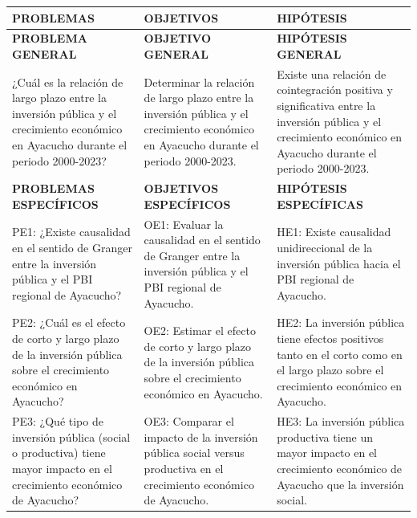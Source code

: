 \documentclass[
  man,
  floatsintext,
  longtable,
  a4paper,
  nolmodern,
  notxfonts,
  notimes,
  12pt,
  colorlinks=true,linkcolor=blue,citecolor=blue,urlcolor=blue]{apa7}
\newcounter{none} %
\begin{document}
{\def\LTcaptype{none} %
\begin{longtable}[]{@{}
  >{\raggedright\arraybackslash}p{}
  >{\raggedright\arraybackslash}p{}
  >{\raggedright\arraybackslash}p{}@{}}
\toprule\noalign{}
\begin{minipage}[b]{\linewidth}\raggedright
PROBLEMAS
\end{minipage} & \begin{minipage}[b]{\linewidth}\raggedright
OBJETIVOS
\end{minipage} & \begin{minipage}[b]{\linewidth}\raggedright
HIPÓTESIS
\end{minipage} \\
\midrule\noalign{}
\endhead
\bottomrule\noalign{}
\endlastfoot
\textbf{PROBLEMA GENERAL} & \textbf{OBJETIVO GENERAL} &
\textbf{HIPÓTESIS GENERAL} \\
¿Cuál es la relación de largo plazo entre la inversión pública y el
crecimiento económico en Ayacucho durante el periodo 2000-2023? &
Determinar la relación de largo plazo entre la inversión pública y el
crecimiento económico en Ayacucho durante el periodo 2000-2023. & Existe
una relación de cointegración positiva y significativa entre la
inversión pública y el crecimiento económico en Ayacucho durante el
periodo 2000-2023. \\
\textbf{PROBLEMAS ESPECÍFICOS} & \textbf{OBJETIVOS ESPECÍFICOS} &
\textbf{HIPÓTESIS ESPECÍFICAS} \\
PE1: ¿Existe causalidad en el sentido de Granger entre la inversión
pública y el PBI regional de Ayacucho? & OE1: Evaluar la causalidad en
el sentido de Granger entre la inversión pública y el PBI regional de
Ayacucho. & HE1: Existe causalidad unidireccional de la inversión
pública hacia el PBI regional de Ayacucho. \\
PE2: ¿Cuál es el efecto de corto y largo plazo de la inversión pública
sobre el crecimiento económico en Ayacucho? & OE2: Estimar el efecto de
corto y largo plazo de la inversión pública sobre el crecimiento
económico en Ayacucho. & HE2: La inversión pública tiene efectos
positivos tanto en el corto como en el largo plazo sobre el crecimiento
económico en Ayacucho. \\
PE3: ¿Qué tipo de inversión pública (social o productiva) tiene mayor
impacto en el crecimiento económico de Ayacucho? & OE3: Comparar el
impacto de la inversión pública social versus productiva en el
crecimiento económico de Ayacucho. & HE3: La inversión pública
productiva tiene un mayor impacto en el crecimiento económico de
Ayacucho que la inversión social. \\
\end{longtable}
}
\end{document}
